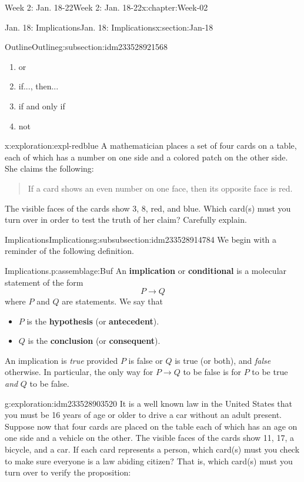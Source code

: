 \documentclass[oneside,10pt,]{book}
\newcommand{\terminology}[1]{\textbf{#1}}
\numberwithin{equation}{section}
\begin{document}
\begin{chapterptx}{Week 2: Jan. 18-22}{}{Week 2: Jan. 18-22}{}{}{x:chapter:Week-02}
\begin{sectionptx}{Jan. 18: Implications}{}{Jan. 18: Implications}{}{}{x:section:Jan-18}
\begin{subsectionptx}{Outline}{}{Outline}{}{}{g:subsection:idm233528921568}
\begin{enumerate}
\item{}or%
\item{}if..., then...%
\item{}if and only if%
\item{}not%
\end{enumerate}
\begin{exploration}{}{x:exploration:expl-redblue}%
A mathematician places a set of four cards on a table, each of which has a number on one side and a colored patch on the other side. She claims the following: \begin{quote}%
If a card shows an even number on one face, then its opposite face is red.\end{quote}
 The visible faces of the cards show 3, 8, red, and blue. Which card(s) must you turn over in order to test the truth of her claim? Carefully explain.%
\end{exploration}%
%
%
\typeout{************************************************}
\typeout{************************************************}
%
\begin{subsubsectionptx}{Implications}{}{Implications}{}{}{g:subsubsection:idm233528914784}
We begin with a reminder of the following definition.%
\begin{assemblage}{Implications.}{p:assemblage:Buf}%
An \terminology{implication} or \terminology{conditional} is a molecular statement of the form%
\begin{equation*}
P \to Q
\end{equation*}
where \(P\) and \(Q\) are statements. We say that%
\begin{itemize}[label=\textbullet]
\item{}\(P\) is the \terminology{hypothesis} (or \terminology{antecedent}).%
\item{}\(Q\) is the \terminology{conclusion} (or \terminology{consequent}).%
\end{itemize}
%
\par
An implication is \emph{true} provided \(P\) is false or \(Q\) is true (or both), and \emph{false} otherwise. In particular, the only way for \(P \to Q\) to be false is for \(P\) to be true \emph{and} \(Q\) to be false.%
\end{assemblage}
\begin{exploration}{}{g:exploration:idm233528903520}%
It is a well known law in the United States that you must be 16 years of age or older to drive a car without an adult present. Suppose now that four cards are placed on the table each of which has an age on one side and a vehicle on the other. The visible faces of the cards show 11, 17, a bicycle, and a car. If each card represents a person, which card(s) must you check to make sure everyone is a law abiding citizen? That is, which card(s) must you turn over to verify the proposition:%

\end{exploration}
\end{subsubsectionptx}
\end{subsectionptx}
\end{sectionptx}
\end{chapterptx}
\end{document}
